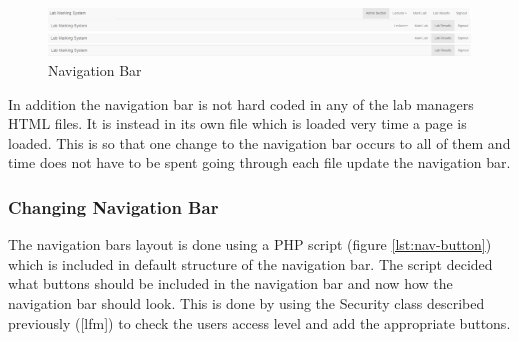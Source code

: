 \documentclass[12pt]{article}  %
\begin{document}
\begin{figure}[H]
    \centering
    \includegraphics[width=1\textwidth]{images/implementation/nav-all.png}
    \caption{Navigation Bar}
    \label{fig:nav-all}
\end{figure}

\noindent In addition the navigation bar is not hard coded in any of the lab managers HTML files. It is instead in its own file which is loaded very time a page is loaded. This is so that one change to the navigation bar occurs to all of them and time does not have to be spent going through each file update the navigation bar.

\subsubsection*{Changing Navigation Bar}

The navigation bars layout is done using a PHP script (figure \ref{lst:nav-button}) which is included in default structure of the navigation bar. The script decided what buttons should be included in the navigation bar and now how the navigation bar should look. This is done by using the  Security class described previously ([lfm]) to check the users access level and add the appropriate buttons. 
\end{document}
